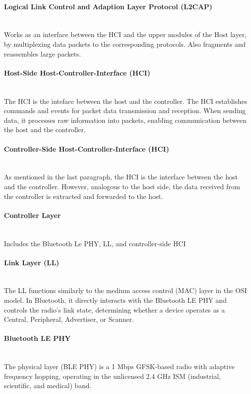 {	\paragraph{Logical Link Control and Adaption Layer Protocol (L2CAP)}\mbox{}\\
	Works as an interface between the HCI and the upper modules of the Host layer, by multiplexing data packets to the corresponding protocols. Also fragments and reassembles large packets.
	
	\paragraph{Host-Side Host-Controller-Interface (HCI) }\mbox{}\\
	The HCI is the inteface between the host and the controller. The HCI establishes commands and events for packet data transmission and reception. When sending data, it processes raw information into packets, enabling communication between the host and the controller.
	
	\paragraph{Controller-Side Host-Controller-Interface (HCI) }\mbox{}\\
	As mentioned in the last paragraph, the HCI is the interface between the host and the controller. However, analogous to the host side, the data received from the controller is extracted and forwarded to the host.
	
	\paragraph{Controller Layer}\mbox{}\\
	Includes the Bluetooth Le PHY, LL, and controller-side HCI
	
	\paragraph{Link Layer (LL)}\mbox{}\\
	The LL functions similarly to the medium access control (MAC) layer in the OSI model. In Bluetooth, it directly interacts with the Bluetooth LE PHY and controls the radio’s link state, determining whether a device operates as a Central, Peripheral, Advertiser, or Scanner.
	
	\paragraph{Bluetooth LE PHY}\mbox{}\\
	The physical layer (BLE PHY) is a 1 Mbps GFSK-based radio with adaptive frequency hopping, operating in the unlicensed 2.4 GHz ISM (industrial, scientific, and medical) band.
	\cite{BLELayers}
}	








